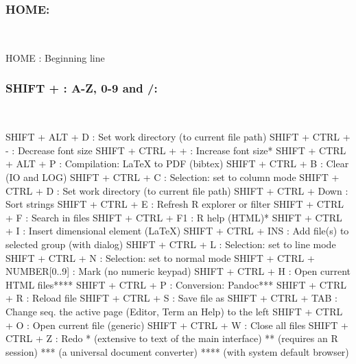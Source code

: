 \subsubsection{HOME:}\\

\vspace{-0.5cm}
\begin{Rtables}[caption={[HOME keyboard shortcut]
    HOME keyboard shortcut},
  label=shortcut:home]
  HOME : Beginning line
\end{Rtables}


\newpage
\subsubsection{SHIFT + : A-Z, 0-9 and /:}\\

\begin{Rtables}[caption={[SHIFT + keyboard shortcuts]
    SHIFT + keyboard shortcuts},
  label=shortcut:shiftplus]
  SHIFT + ALT  + D            : Set work directory (to current file path)
  SHIFT + CTRL + -            : Decrease font size
  SHIFT + CTRL + +            : Increase font size*
  SHIFT + CTRL + ALT + P      : Compilation: LaTeX to PDF (bibtex)
  SHIFT + CTRL + B            : Clear (IO and LOG)
  SHIFT + CTRL + C            : Selection: set to column mode
  SHIFT + CTRL + D            : Set work directory (to current file path)
  SHIFT + CTRL + Down         : Sort strings
  SHIFT + CTRL + E            : Refresh R explorer or filter
  SHIFT + CTRL + F            : Search in files
  SHIFT + CTRL + F1           : R help (HTML)*
  SHIFT + CTRL + I            : Insert dimensional element (LaTeX)
  SHIFT + CTRL + INS          : Add file(s) to selected group (with dialog)
  SHIFT + CTRL + L            : Selection: set to line mode
  SHIFT + CTRL + N            : Selection: set to normal mode
  SHIFT + CTRL + NUMBER[0..9] : Mark (no numeric keypad)
  SHIFT + CTRL + H            : Open current HTML files****
  SHIFT + CTRL + P            : Conversion: Pandoc***
  SHIFT + CTRL + R            : Reload file
  SHIFT + CTRL + S            : Save file as
  SHIFT + CTRL + TAB          : Change seq. the active page (Editor, Term an Help) to the left
  SHIFT + CTRL + O            : Open current file (generic)
  SHIFT + CTRL + W            : Close all files
  SHIFT + CTRL + Z            : Redo
  *    (extensive to text of the main interface)
  **   (requires an R session)
  ***  (a universal document converter)
  **** (with system default browser)
\end{Rtables}

